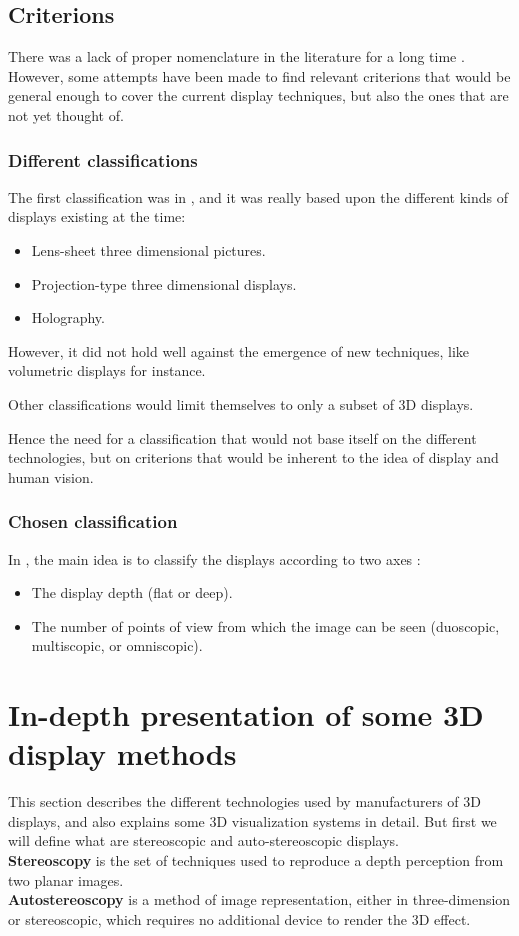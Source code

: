 \subsection{Criterions}
There was a lack of proper nomenclature in the literature for a long time \cite{pimenta2012comprehensive}. However, some attempts have been made to find relevant criterions that would be general enough to cover the current display techniques, but also the ones that are not yet thought of.

\subsubsection{Different classifications}
The first classification was in \cite{okoshi1976three}, and it was really based upon the different kinds of displays existing at the time: 
\begin{itemize}
\item Lens-sheet three dimensional pictures.
\item Projection-type three dimensional displays.
\item Holography.
\end{itemize}

However, it did not hold well against the emergence of new techniques, like volumetric displays for instance.

Other classifications %
would limit themselves to only a subset of 3D displays.

Hence the need for a classification that would not base itself on the different technologies, but on criterions that would be inherent to the idea of display and human vision.

\subsubsection{Chosen classification}
In \cite{pimenta2012comprehensive}, the main idea is to classify the displays according to two axes : 

\begin{itemize}
\item The display depth (flat or deep).
\item The number of points of view from which the image can be seen (duoscopic, multiscopic, or omniscopic).
\end{itemize}

\section{In-depth presentation of some 3D display methods}
This section describes the different technologies used by manufacturers of 3D displays, and also explains some 3D visualization systems in detail. But first we will define what are stereoscopic and auto-stereoscopic displays. \\
\textbf{Stereoscopy} is the set of techniques used to reproduce a depth perception from two planar images.\\
\textbf{Autostereoscopy} is a method of image representation, either in three-dimension or stereoscopic, which requires no additional device to render the 3D effect. 

